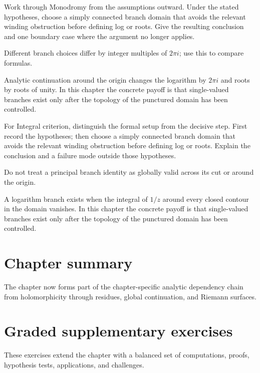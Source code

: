 \begin{exercise}\label{exr:iv14-07}
Work through Monodromy from the assumptions outward. Under the stated hypotheses, choose a simply connected branch domain that avoids the relevant winding obstruction before defining log or roots. Give the resulting conclusion and one boundary case where the argument no longer applies.
\end{exercise}
\begin{hint}
Different branch choices differ by integer multiples of \(2\pi i\); use this to compare formulas.
\end{hint}
\begin{solution}
Analytic continuation around the origin changes the logarithm by $2\pi i$ and roots by roots of unity. In this chapter the concrete payoff is that single-valued branches exist only after the topology of the punctured domain has been controlled.
\end{solution}

\begin{exercise}\label{exr:iv14-08}
For Integral criterion, distinguish the formal setup from the decisive step. First record the hypotheses; then choose a simply connected branch domain that avoids the relevant winding obstruction before defining log or roots. Explain the conclusion and a failure mode outside those hypotheses.
\end{exercise}
\begin{hint}
Do not treat a principal branch identity as globally valid across its cut or around the origin.
\end{hint}
\begin{solution}
A logarithm branch exists when the integral of $1/z$ around every closed contour in the domain vanishes. In this chapter the concrete payoff is that single-valued branches exist only after the topology of the punctured domain has been controlled.
\end{solution}

\section*{Chapter summary}
The chapter now forms part of the chapter-specific analytic dependency chain from holomorphicity through residues, global continuation, and Riemann surfaces.
\section{Graded supplementary exercises}
These exercises extend the chapter with a balanced set of computations, proofs, hypothesis tests, applications, and challenges.

